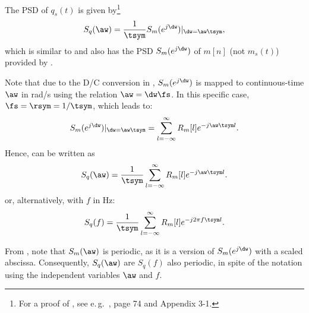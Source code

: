 The PSD of $q_s(t)$ is given by\footnote{For a proof of , see e.\,g.~\cite{Barry04}, page 74 and Appendix 3-1.}
\begin{equation}
S_q(\aw) = \frac{1}{\tsym} S_m(e^{j\dw})|_{\dw=\aw \tsym},
\label{eq:upsampledPSDContinuousTime}
\end{equation}
which is similar to  and
also has the PSD $S_m(e^{j\dw})$ of $m[n]$ (not $m_s(t)$) provided by .

Note that due to the D/C conversion in , $S_m(e^{j\dw})$ is mapped to continuous-time $\aw$ in rad/s using the relation $\aw = \dw \fs$. In this specific case, $\fs = \rsym=1/\tsym$, which leads to:
\[
S_m(e^{j\dw})|_{\dw=\aw \tsym} = \sum_{l=-\infty}^{\infty} R_m[l] e^{-j \aw \tsym l}.
\]
Hence,  can be written as
\begin{equation}
S_q(\aw) = \frac{1}{\tsym} \sum_{l=-\infty}^{\infty} R_m[l] e^{-j \aw \tsym l}.
\label{eq:upsampledPSDContinuousTime2}
\end{equation}
or, alternatively, with $f$ in Hz:
\begin{equation}
S_q(f) = \frac{1}{\tsym} \sum_{l=-\infty}^{\infty} R_m[l] e^{-j 2 \pi f \tsym l}.
\label{eq:upsampledPSDContinuousTimeHz}
\end{equation}


From , note that $S_m(\aw)$ is periodic, as it is a version of $S_m(e^{j\dw})$ with a scaled abscissa. Consequently, $S_q(\aw)$ are $S_q(f)$ also periodic, in spite of the notation using the independent variables $\aw$ and $f$. 

